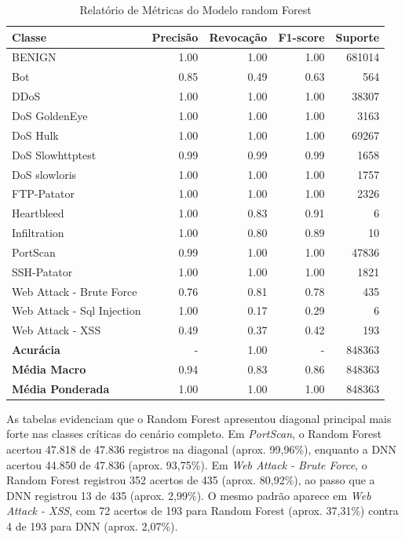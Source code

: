\documentclass[12pt,oneside]{abntex2}
\begin{document}
\begin{table}[H]
\centering
\small
\begin{tabular}{lrrrr}
\toprule
Classe & Precisão & Revocação & F1-score & Suporte \\
\midrule
BENIGN & 1.00 & 1.00 & 1.00 & 681014 \\
Bot & 0.85 & 0.49 & 0.63 & 564 \\
DDoS & 1.00 & 1.00 & 1.00 & 38307 \\
DoS GoldenEye & 1.00 & 1.00 & 1.00 & 3163 \\
DoS Hulk & 1.00 & 1.00 & 1.00 & 69267 \\
DoS Slowhttptest & 0.99 & 0.99 & 0.99 & 1658 \\
DoS slowloris & 1.00 & 1.00 & 1.00 & 1757 \\
FTP-Patator & 1.00 & 1.00 & 1.00 & 2326 \\
Heartbleed & 1.00 & 0.83 & 0.91 & 6 \\
Infiltration & 1.00 & 0.80 & 0.89 & 10 \\
PortScan & 0.99 & 1.00 & 1.00 & 47836 \\
SSH-Patator & 1.00 & 1.00 & 1.00 & 1821 \\
Web Attack - Brute Force & 0.76 & 0.81 & 0.78 & 435 \\
Web Attack - Sql Injection & 1.00 & 0.17 & 0.29 & 6 \\
Web Attack - XSS & 0.49 & 0.37 & 0.42 & 193 \\
\midrule
\textbf{Acurácia} & - & 1.00 & - & 848363 \\
\textbf{Média Macro} & 0.94 & 0.83 & 0.86 & 848363 \\
\textbf{Média Ponderada} & 1.00 & 1.00 & 1.00 & 848363 \\
\bottomrule
\end{tabular}
\caption{Relatório de Métricas do Modelo random Forest}
\label{table:rel_metr_rf}
\end{table}

As tabelas evidenciam que o Random Forest apresentou diagonal principal mais forte nas classes críticas do cenário completo. Em \textit{PortScan}, o Random Forest acertou 47.818 de 47.836 registros na diagonal (aprox. 99,96\%), enquanto a DNN acertou 44.850 de 47.836 (aprox. 93,75\%). Em \textit{Web Attack - Brute Force}, o Random Forest registrou 352 acertos de 435 (aprox. 80,92\%), ao passo que a DNN registrou 13 de 435 (aprox. 2,99\%). O mesmo padrão aparece em \textit{Web Attack - XSS}, com 72 acertos de 193 para Random Forest (aprox. 37,31\%) contra 4 de 193 para DNN (aprox. 2,07\%).
\end{document}
